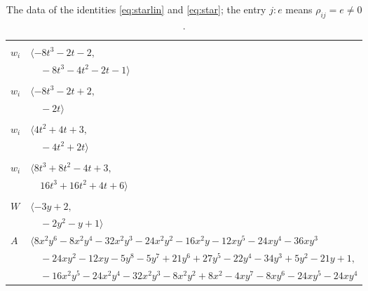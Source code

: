 \documentclass[11pt]{article}
\begin{document}
\begingroup\scriptsize
\setlength{\LTcapwidth}{\textwidth}
\begin{longtable}{@{}ll@{}}
\caption{The data of the identities \eqref{eq:starlin} and \eqref{eq:star}; the entry $j{:}e$ means $\rho_{ij}=e\neq0$.}\label{tab:star}\\
\hline\endfirsthead\hline\endhead\hline\endfoot
\multicolumn{2}{@{}p{0.97\textwidth}@{}}{$i=0$, $D_i=1$, $\rho_{ij}$: $4{:}1, \allowbreak 10{:}1, \allowbreak 11{:}2, \allowbreak 15{:}2, \allowbreak 16{:}1$}\\
$w_i$ & $\langle -8t^{3}-2t-2,$\\
 & $\quad -8t^{3}-4t^{2}-2t-1\rangle$\\
\addlinespace[2pt]
\multicolumn{2}{@{}p{0.97\textwidth}@{}}{$i=1$, $D_i=1$, $\rho_{ij}$: $4{:}1, \allowbreak 5{:}2, \allowbreak 6{:}1, \allowbreak 15{:}2, \allowbreak 19{:}1, \allowbreak 24{:}2$}\\
$w_i$ & $\langle -8t^{3}-2t+2,$\\
 & $\quad -2t\rangle$\\
\addlinespace[2pt]
\multicolumn{2}{@{}p{0.97\textwidth}@{}}{$i=2$, $D_i=1$, $\rho_{ij}$: $6{:}2, \allowbreak 10{:}2, \allowbreak 12{:}1, \allowbreak 19{:}1, \allowbreak 21{:}2$}\\
$w_i$ & $\langle 4t^{2}+4t+3,$\\
 & $\quad -4t^{2}+2t\rangle$\\
\addlinespace[2pt]
\multicolumn{2}{@{}p{0.97\textwidth}@{}}{$i=3$, $D_i=3$, $\rho_{ij}$: $13{:}2, \allowbreak 16{:}1, \allowbreak 18{:}1, \allowbreak 21{:}2$}\\
$w_i$ & $\langle 8t^{3}+8t^{2}-4t+3,$\\
 & $\quad 16t^{3}+16t^{2}+4t+6\rangle$\\
\addlinespace[2pt]
\multicolumn{2}{@{}p{0.97\textwidth}@{}}{$i=4$, $D_i=1$, $\rho_{ij}$: $0{:}2, \allowbreak 1{:}2, \allowbreak 15{:}1, \allowbreak 17{:}2, \allowbreak 18{:}1, \allowbreak 20{:}2, \allowbreak 21{:}2$}\\
$W$ & $\langle -3y+2,$\\
 & $\quad -2y^{2}-y+1\rangle$\\
$A$ & $\langle 8x^{2}y^{6}-8x^{2}y^{4}-32x^{2}y^{3}-24x^{2}y^{2}-16x^{2}y-12xy^{5}-24xy^{4}-36xy^{3}$\\
 & $\quad -24xy^{2}-12xy-5y^{8}-5y^{7}+21y^{6}+27y^{5}-22y^{4}-34y^{3}+5y^{2}-21y+1,$\\
 & $\quad -16x^{2}y^{5}-24x^{2}y^{4}-32x^{2}y^{3}-8x^{2}y^{2}+8x^{2}-4xy^{7}-8xy^{6}-24xy^{5}-24xy^{4}$\\

\end{longtable}
\end{document}
